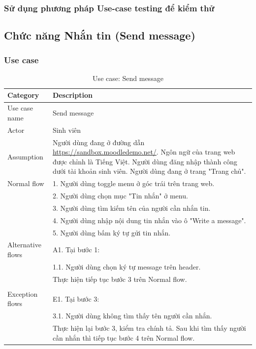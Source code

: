 \documentclass[a4paper, 12pt]{article}
\begin{document}
\subsubsection{Sử dụng phương pháp Use-case testing để kiểm thử}

\subsection{Chức năng Nhắn tin (Send message)}
\subsubsection{Use case}

\begin{table}[H]
    \centering
    \begin{tabular}{|l|p{11cm}|}
        \hline
        Category & Description \\
        \hline
        Use case name & Send message \\
        \hline
        Actor & Sinh viên \\
        \hline
        Assumption & Người dùng đang ở đường dẫn \url{https://sandbox.moodledemo.net/}. Ngôn ngữ của trang web được chỉnh là Tiếng Việt. Người dùng đăng nhập thành công dưới tài khoản sinh viên. Người dùng đang ở trang "Trang chủ".\\\hline
        Normal flow & 
        1. Người dùng toggle menu ở góc trái trên trang web. \\
        & 2. Người dùng chọn mục "Tin nhắn" ở menu. \\
        & 3. Người dùng tìm kiếm tên của người cần nhắn tin.\\
        & 4. Người dùng nhập nội dung tin nhắn vào ô "Write a message".\\
        & 5. Người dùng bấm ký tự gửi tin nhắn.\\\hline
        Alternative flows &
        A1. Tại bước 1:\\
        & 1.1. Người dùng chọn ký tự message trên header.\\
        & Thực hiện tiếp tục bước 3 trên Normal flow.\\
        \\\hline
        Exception flows &
        E1. Tại bước 3:\\
        & 3.1. Người dùng không tìm thấy tên người cần nhắn.\\
        & Thực hiện lại bước 3, kiểm tra chính tả. Sau khi tìm thấy người cần nhắn thì tiếp tục bước 4 trên Normal flow.\\\hline
    \end{tabular}
    \caption{Use case: Send message}
    \label{tab:send-message}
\end{table}
\end{document}
